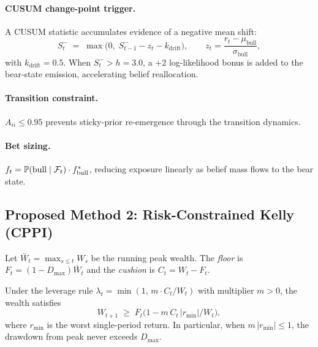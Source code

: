 \paragraph{CUSUM change-point trigger.}
A CUSUM statistic accumulates evidence of a negative mean shift:
\begin{equation}
    S_t^- \;=\; \max\!\bigl(0,\;
    S_{t-1}^- - z_t - k_{\mathrm{drift}}\bigr),
    \qquad
    z_t = \frac{r_t - \mu_{\text{bull}}}{\sigma_{\text{bull}}},
    \label{eq:cusum}
\end{equation}
with $k_{\mathrm{drift}}=0.5$.  When $S_t^- > h=3.0$, a $+2$ log-likelihood
bonus is added to the bear-state emission, accelerating belief reallocation.

\paragraph{Transition constraint.}
$A_{ii} \leq 0.95$ prevents sticky-prior re-emergence through the transition
dynamics.

\paragraph{Bet sizing.}
$f_t = \mathbb{P}(\text{bull}\mid\mathcal{F}_t)\cdot f^*_{\text{bull}}$, reducing
exposure linearly as belief mass flows to the bear state.

\subsection{Proposed Method 2: Risk-Constrained Kelly (CPPI)}
\label{sec:cppi}

\begin{definition}
\label{def:cppi}
Let $\bar W_t = \max_{s\leq t}W_s$ be the running peak wealth.  The
\emph{floor} is $F_t = (1-D_{\max})\bar W_t$ and the
\emph{cushion} is $C_t = W_t - F_t$.
\end{definition}

\begin{proposition}
\label{prop:cppi_bound}
Under the leverage rule $\lambda_t = \min(1,\, m\cdot C_t / W_t)$ with
multiplier $m > 0$, the wealth satisfies
\begin{equation}
    W_{t+1} \;\geq\; F_t\bigl(1 - m\,C_t\,|r_{\min}|/W_t\bigr),
    \label{eq:cppi_bound}
\end{equation}
where $r_{\min}$ is the worst single-period return.  In particular, when
$m\,|r_{\min}| \leq 1$, the drawdown from peak never exceeds $D_{\max}$.
\end{proposition}

